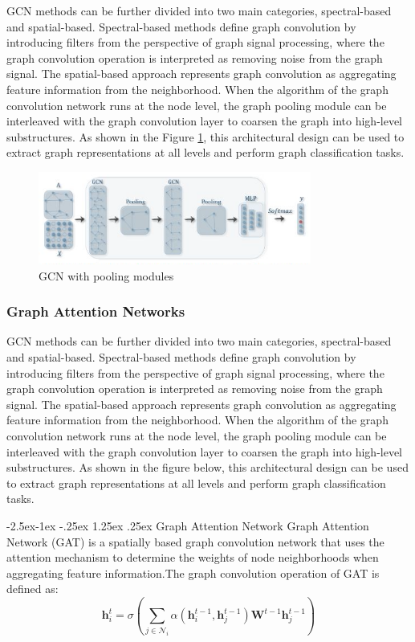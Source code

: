 \documentclass[11pt,en]{elegantpaper}
\makeatletter
\renewcommand\paragraph{\@startsection{paragraph}{4}{\z@}%
            {-2.5ex\@plus -1ex \@minus -.25ex}%
            {1.25ex \@plus .25ex}%
            {\normalfont\normalsize\bfseries}}
\makeatother
\begin{document}
GCN methods can be further divided into two main categories, spectral-based and spatial-based. Spectral-based methods define graph convolution by introducing filters from the perspective of graph signal processing, where the graph convolution operation is interpreted as removing noise from the graph signal. The spatial-based approach represents graph convolution as aggregating feature information from the neighborhood. When the algorithm of the graph convolution network runs at the node level, the graph pooling module can be interleaved with the graph convolution layer to coarsen the graph into high-level substructures. As shown in the Figure \ref{gcn2}, this architectural design can be used to extract graph representations at all levels and perform graph classification tasks.


\begin{figure}[h]
	\centering
	\includegraphics[width=0.8\textwidth]{./image/gcn2.png}
	\caption{GCN with pooling modules}
	\label{gcn2}
\end{figure}

\subsubsection{Graph Attention Networks}
GCN methods can be further divided into two main categories, spectral-based and spatial-based. Spectral-based methods define graph convolution by introducing filters from the perspective of graph signal processing, where the graph convolution operation is interpreted as removing noise from the graph signal. The spatial-based approach represents graph convolution as aggregating feature information from the neighborhood. When the algorithm of the graph convolution network runs at the node level, the graph pooling module can be interleaved with the graph convolution layer to coarsen the graph into high-level substructures. As shown in the figure below, this architectural design can be used to extract graph representations at all levels and perform graph classification tasks.

\paragraph{Graph Attention Network}
Graph Attention Network (GAT) is a spatially based graph convolution network that uses the attention mechanism to determine the weights of node neighborhoods when aggregating feature information.The graph convolution operation of GAT is defined as: 
$$\mathbf{h}_{i}^{t}=\sigma\left(\sum_{j \in \mathcal{N}_{i}} \alpha\left(\mathbf{h}_{i}^{t-1}, \mathbf{h}_{j}^{t-1}\right) \mathbf{W}^{t-1} \mathbf{h}_{j}^{t-1}\right)$$
\end{document}
